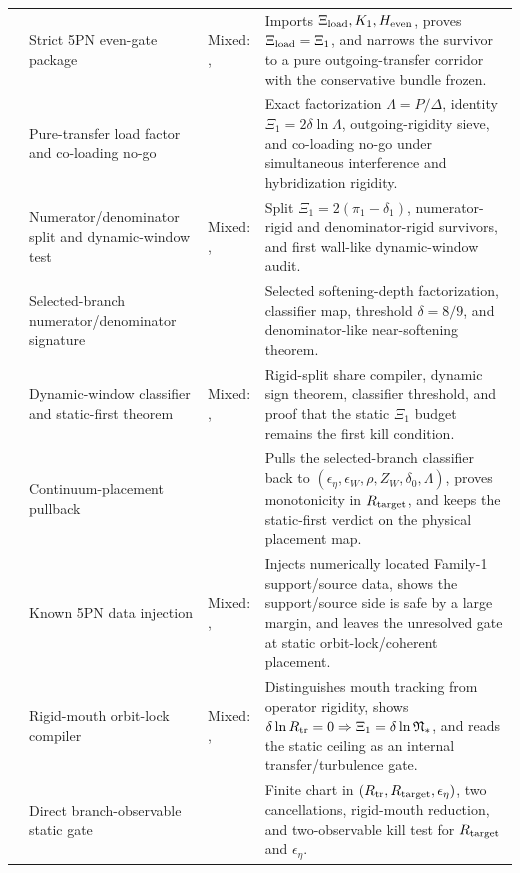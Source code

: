 \begin{longtable}{@{}L{0.075\textwidth}L{0.34\textwidth}L{0.20\textwidth}L{0.33\textwidth}@{}}
 & Strict 5PN even-gate package & Mixed: \StatusExactClosure{}, \StatusReduced{} & Imports \(\Xi_{\rm load},K_1,H_{\rm even}\), proves \(\Xi_{\rm load}=\Xi_1\), and narrows the survivor to a pure outgoing-transfer corridor with the conservative bundle frozen. \\
 & Pure-transfer load factor and co-loading no-go & \StatusExactClosure{} & Exact factorization \(\Lambda=P/\Delta\), identity \(\Xi_1=2\delta\ln\Lambda\), outgoing-rigidity sieve, and co-loading no-go under simultaneous interference and hybridization rigidity. \\
 & Numerator/denominator split and dynamic-window test & Mixed: \StatusExactClosure{}, \StatusNumerical{} & Split \(\Xi_1=2(\pi_1-\delta_1)\), numerator-rigid and denominator-rigid survivors, and first wall-like dynamic-window audit. \\
 & Selected-branch numerator/denominator signature & \StatusExactClosure{} & Selected softening-depth factorization, classifier map, threshold \(\delta=8/9\), and denominator-like near-softening theorem. \\
 & Dynamic-window classifier and static-first theorem & Mixed: \StatusExactClosure{}, \StatusNumerical{} & Rigid-split share compiler, dynamic sign theorem, classifier threshold, and proof that the static \(\Xi_1\) budget remains the first kill condition. \\
 & Continuum-placement pullback & \StatusExactClosure{} & Pulls the selected-branch classifier back to \((\epsilon_\eta,\epsilon_W,\rho,Z_W,\delta_0,\Lambda)\), proves monotonicity in \(R_{\rm target}\), and keeps the static-first verdict on the physical placement map. \\
 & Known 5PN data injection & Mixed: \StatusNumerical{}, \StatusOpen{} & Injects numerically located Family-1 support/source data, shows the support/source side is safe by a large margin, and leaves the unresolved gate at static orbit-lock/coherent placement. \\
 & Rigid-mouth orbit-lock compiler & Mixed: \StatusExactClosure{}, \StatusOpen{} & Distinguishes mouth tracking from operator rigidity, shows \(\delta\ln R_{\rm tr}=0\Rightarrow\Xi_1=\delta\ln\mathfrak N_*\), and reads the static ceiling as an internal transfer/turbulence gate. \\
 & Direct branch-observable static gate & \StatusExactClosure{} & Finite chart in \((R_{\rm tr},R_{\rm target},\epsilon_\eta)\), two cancellations, rigid-mouth reduction, and two-observable kill test for \(R_{\rm target}\) and \(\epsilon_\eta\). \\

\end{longtable}
